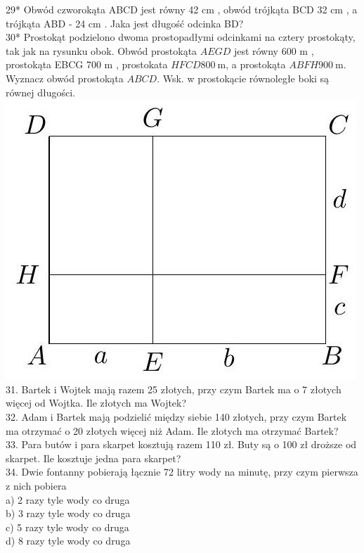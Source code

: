 \documentclass[10pt]{article}
\begin{document}
29* Obwód czworokąta ABCD jest równy 42 cm , obwód trójkąta BCD 32 cm , a trójkąta ABD - 24 cm . Jaka jest długość odcinka BD?\\
30* Prostokąt podzielono dwoma prostopadłymi odcinkami na cztery prostokąty, tak jak na rysunku obok. Obwód prostokąta \(A E G D\) jest równy 600 m , prostokąta EBCG 700 m , prostokata \(H F C D 800 \mathrm{~m}\), a prostokąta \(A B F H 900 \mathrm{~m}\). Wyznacz obwód prostokąta \(A B C D\). Wsk. w prostokącie równoległe boki są równej długości.\\
\includegraphics[max width=\textwidth, center]{2024_11_21_8f01584889ff06348ae7g-011}\\
31. Bartek i Wojtek mają razem 25 złotych, przy czym Bartek ma o 7 złotych więcej od Wojtka. Ile złotych ma Wojtek?\\
32. Adam i Bartek mają podzielić między siebie 140 złotych, przy czym Bartek ma otrzymać o 20 złotych więcej niż Adam. Ile złotych ma otrzymać Bartek?\\
33. Para butów i para skarpet kosztują razem 110 zł. Buty są o 100 zł droższe od skarpet. Ile kosztuje jedna para skarpet?\\
34. Dwie fontanny pobierają łącznie 72 litry wody na minutę, przy czym pierwsza z nich pobiera\\
a) 2 razy tyle wody co druga\\
b) 3 razy tyle wody co druga\\
c) 5 razy tyle wody co druga\\
d) 8 razy tyle wody co druga
\end{document}

